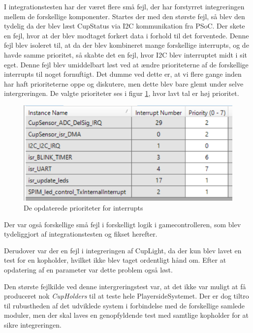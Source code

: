 \documentclass[Integrationstest/Integrationstest_main.tex]{subfiles}
\begin{document}
I integrationstesten har der været flere små fejl, der har forstyrret integreringen mellem de forskellige komponenter. Startes der med den største fejl, så blev den tydelig da der blev læst CupStatus via I2C kommunikation fra PSoC. Der skete en fejl, hvor at der blev modtaget forkert data i forhold til det forventede. Denne fejl blev isoleret til, at da der blev kombineret mange forskellige interrupts, og de havde samme prioritet, så skabte det en fejl, hvor I2C blev interruptet midt i sit eget. Denne fejl blev umiddelbart løst ved at ændre prioriteterne af de forskellige interrupts til noget fornuftigt. Det dumme ved dette er, at vi flere gange inden har haft prioriteterne oppe og diskutere, men dette blev bare glemt under selve intergreringen. De valgte prioriteter ses i figur \ref{fig:int_interrupt_priorities}, hvor lavt tal er høj prioritet.
\begin{figure}[H]
    \centering
    \includegraphics[width=\textwidth]{Integrationstest/Integrationstest_PlayerSide/graphics/CupSensorInt/Interrupts_prio.png}
    \caption{De opdaterede prioriteter for interrupts}
    \label{fig:int_interrupt_priorities}
\end{figure}

Der var også forskellige små fejl i forskelligt logik i gamecontrolleren, som blev tydeliggjort af integrationstesten og fikset herefter.

Derudover var der en fejl i integreringen af CupLight, da der kun blev lavet en test for en kopholder, hvilket ikke blev taget ordentligt hånd om. Efter at opdatering af en parameter var dette problem også løst.

Den største fejlkilde ved denne intergreringstest var, at det ikke var muligt at få produceret nok \textit{CupHolders} til at teste hele PlayersideSystemet. Der er dog tiltro til rubustheden af det udviklede system i forbindelse med de forskellige samlede moduler, men der skal laves en genopfyldende test med samtlige kopholder for at sikre integreringen. 
\end{document}
